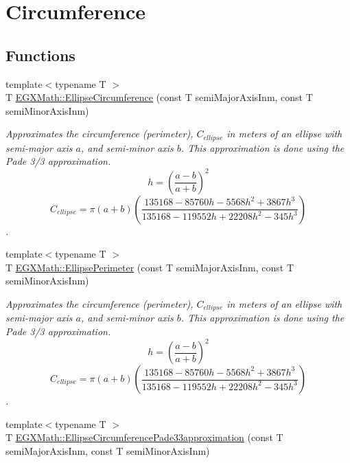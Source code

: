 \hypertarget{group___e_g_x_math-_geometry-2_d-_ellipse-_circumference}{}\section{Circumference}
\label{group___e_g_x_math-_geometry-2_d-_ellipse-_circumference}
\subsection*{Functions}
\begin{DoxyCompactItemize}
\item 
{\footnotesize template$<$typename T $>$ }\\T \mbox{\hyperlink{group___e_g_x_math-_geometry-2_d-_ellipse-_circumference_ga4172802ac674eb53467b44928ac635c7}{E\+G\+X\+Math\+::\+Ellipse\+Circumference}} (const T semi\+Major\+Axis\+Inm, const T semi\+Minor\+Axis\+Inm)
\begin{DoxyCompactList}\small\item\em Approximates the circumference (perimeter), $C_{ellipse}$ in meters of an ellipse with semi-\/major axis $a$, and semi-\/minor axis $b$. This approximation is done using the Pade 3/3 approximation. \[ h=\left( \frac{a-b}{a+b} \right)^2 \] \[ C_{ellipse}=\pi (a + b) \left( \frac{135168-85760 h-5568 h^2+ 3867 h^3}{135168-119552 h+ 22208 h^2 - 345h^3} \right) \]. \end{DoxyCompactList}\item 
{\footnotesize template$<$typename T $>$ }\\T \mbox{\hyperlink{group___e_g_x_math-_geometry-2_d-_ellipse-_circumference_ga2d4ee70e08d6fb4b56209ad4fc3f38ca}{E\+G\+X\+Math\+::\+Ellipse\+Perimeter}} (const T semi\+Major\+Axis\+Inm, const T semi\+Minor\+Axis\+Inm)
\begin{DoxyCompactList}\small\item\em Approximates the circumference (perimeter), $C_{ellipse}$ in meters of an ellipse with semi-\/major axis $a$, and semi-\/minor axis $b$. This approximation is done using the Pade 3/3 approximation. \[ h=\left( \frac{a-b}{a+b} \right)^2 \] \[ C_{ellipse}=\pi (a + b) \left( \frac{135168-85760 h-5568 h^2+ 3867 h^3}{135168-119552 h+ 22208 h^2 - 345h^3} \right) \]. \end{DoxyCompactList}\item 
{\footnotesize template$<$typename T $>$ }\\T \mbox{\hyperlink{group___e_g_x_math-_geometry-2_d-_ellipse-_circumference_ga0e0b290f1da2605c16ec13b9e221769d}{E\+G\+X\+Math\+::\+Ellipse\+Circumference\+Pade33approximation}} (const T semi\+Major\+Axis\+Inm, const T semi\+Minor\+Axis\+Inm)

\end{DoxyCompactItemize}
